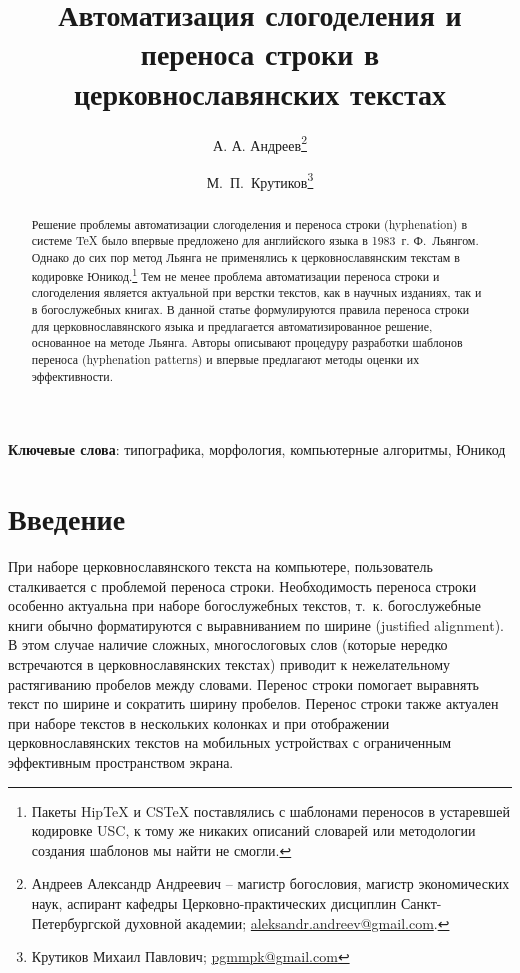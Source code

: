 \documentclass[12pt,a4paper,oneside]{extarticle}
\title{Автоматизация слогоделения и переноса строки в церковнославянских текстах}
\author{А. А. Андреев\thanks{Андреев Александр Андреевич -- магистр богословия, магистр экономических наук, 
аспирант кафедры Церковно-практических дисциплин Санкт-Петербургской духовной академии; \url{aleksandr.andreev@gmail.com}.}
\and М.~П.~Крутиков\thanks{Крутиков Михаил Павлович; \url{pgmmpk@gmail.com}}}
\date{\vspace{-1em}}  %
\providecommand{\keywords}[1]{\textbf{Ключевые слова}: #1}
\begin{document}
\maketitle

\begin{abstract}
Решение проблемы автоматизации слогоделения и переноса строки
(\textenglish{hyphenation}) в системе \TeX{} было впервые предложено для английского языка в 1983~г.
Ф.~Льянгом. Однако до сих пор метод Льянга не применялись к
церковнославянским текстам в кодировке Юникод.\footnote{Пакеты HipTeX и CSTeX поставлялись с шаблонами переносов в устаревшей
кодировке USC, к тому же никаких описаний словарей или методологии создания шаблонов мы найти не смогли.} Тем не менее проблема
автоматизации переноса строки и слогоделения является актуальной при
верстки текстов, как в научных изданиях, так и в богослужебных книгах. В данной статье
формулируются правила переноса строки для церковнославянского языка и
предлагается автоматизированное решение, основанное на методе Льянга.
Авторы описывают процедуру разработки шаблонов переноса (\textenglish{hyphenation patterns})
и впервые предлагают методы оценки их эффективности.
\end{abstract}

\keywords{типографика, морфология, компьютерные алгоритмы, Юникод}

\section{Введение}

При наборе церковнославянского текста на компьютере, пользователь сталкивается с проблемой переноса строки. Необходимость переноса строки особенно актуальна при наборе богослужебных текстов, т.~к. богослужебные книги обычно форматируются с выравниванием по ширине (\textenglish{justified alignment}). В этом случае наличие сложных, многослоговых слов (которые нередко встречаются в церковнославянских текстах) приводит к нежелательному растягиванию пробелов между словами. Перенос строки помогает выравнять текст по ширине и сократить ширину пробелов. Перенос строки также актуален при наборе текстов в нескольких колонках и при отображении церковнославянских текстов на мобильных устройствах с ограниченным эффективным пространством экрана.
\end{document}
